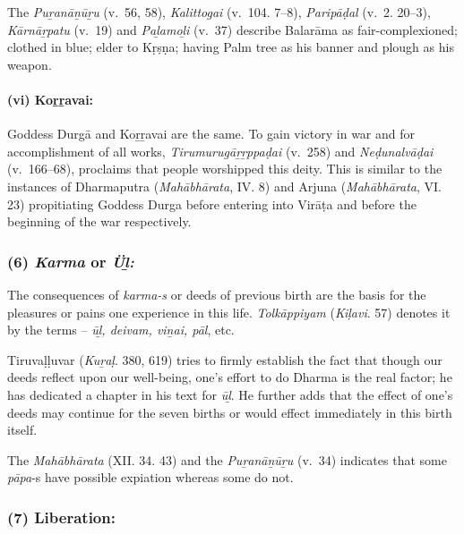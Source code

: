 \vskip -7.5pt

The \textit{Puṟanāṉūṟu} (v.~56, 58), \textit{Kalittogai} (v.~104. 7–8), \textit{Paripāḍal} (v.~2. 20–3), \textit{Kārnāṟpatu} (v.~19) and \textit{Paḻamoḻi} (v.~37) describe Balarāma as fair-complexioned; clothed in blue; elder to Kṛṣṇa; having Palm tree as his banner and plough as his weapon.


\paragraph*{(vi) Koṟṟavai:}

\vskip -7.5pt

Goddess Durgā and Koṟṟavai are the same. To gain victory in war and for accomplishment of all works, \textit{Tirumurugāṟṟppaḍai} (v.~258) and \textit{Neḍunalvāḍai} (v.~166–68), proclaims that people worshipped this deity. This is similar to the instances of Dharmaputra (\textit{Mahābhārata}, IV. 8) and Arjuna (\textit{Mahābhārata}, VI. 23) propitiating Goddess Durga before entering into Virāṭa and before the beginning of the war respectively.


\subsubsection*{(6) \textit{Karma} or \textit{Üḻ:}}

\vskip -7.5pt

The consequences of \textit{karma-s} or deeds of previous birth are the basis for the pleasures or pains one experience in this life. \textit{Tolkāppiyam} (\textit{Kiḷavi}. 57) denotes it by the terms – \textit{ūḻ, deivam, viṉai, pāl}, etc.

Tiruvaḷḷuvar (\textit{Kuṟaḷ}. 380, 619) tries to firmly establish the fact that though our deeds reflect upon our well-being, one’s effort to do Dharma is the real factor; he has dedicated a chapter in his text for \textit{ūḻ}. He further adds that the effect of one’s deeds may continue for the seven births or would effect immediately in this birth itself.

\newpage

The \textit{Mahābhārata} (XII. 34. 43) and the \textit{Puṟanāṉūṟu} (v.~34) indicates that some \textit{pāpa}-s have possible expiation whereas some do not.


\subsubsection*{(7) Liberation:}

